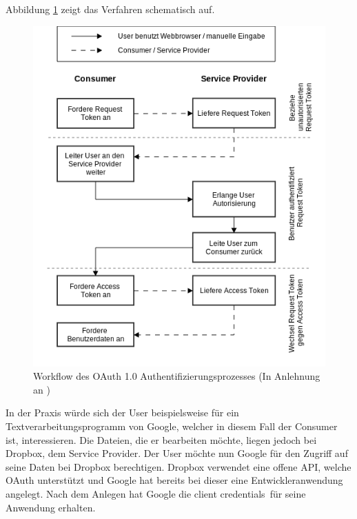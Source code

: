 Abbildung \ref{fig-oauth-workflow} zeigt das Verfahren schematisch auf.

\begin{figure}[H]
  \centering
  \includegraphics[scale=0.6]{resources/Bilder_Kapitel_2/oauth_workflow.png}
  \caption[Workflow des OAuth 1.0 Authentifizierungsprozesses]{Workflow des OAuth 1.0 Authentifizierungsprozesses (In Anlehnung an \cite{oauthdiagramm07})}
  \label{fig-oauth-workflow}
\end{figure}

In der Praxis würde sich der User beispielsweise für ein Textverarbeitungsprogramm von Google, welcher in diesem Fall der Consumer ist, interessieren.
Die Dateien, die er bearbeiten möchte, liegen jedoch bei Dropbox, dem Service Provider.
Der User möchte nun Google für den Zugriff auf seine Daten bei Dropbox berechtigen.
Dropbox verwendet eine offene \ac{API}, welche OAuth unterstützt und Google hat bereits bei dieser eine Entwickleranwendung angelegt.
Nach dem Anlegen hat Google die \frqq client credentials\flqq\ für seine Anwendung erhalten.

